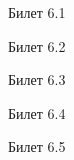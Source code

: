 \documentclass[a4paper,12pt]{article}
\begin{document}
\newpage
\begin{mybox2}{\hypertarget{bil6_1}{Билет 6.1}}
\end{mybox2}
\newpage
\begin{mybox}{\hypertarget{bil6_2}{Билет 6.2}}
\end{mybox}
\newpage
\begin{mybox2}{\hypertarget{bil6_3}{Билет 6.3}}
\end{mybox2}
\newpage
\begin{mybox}{\hypertarget{bil6_4}{Билет 6.4}}
\end{mybox}
\newpage
\begin{mybox2}{\hypertarget{bil6_5}{Билет 6.5}}
\end{mybox2}
\end{document}
